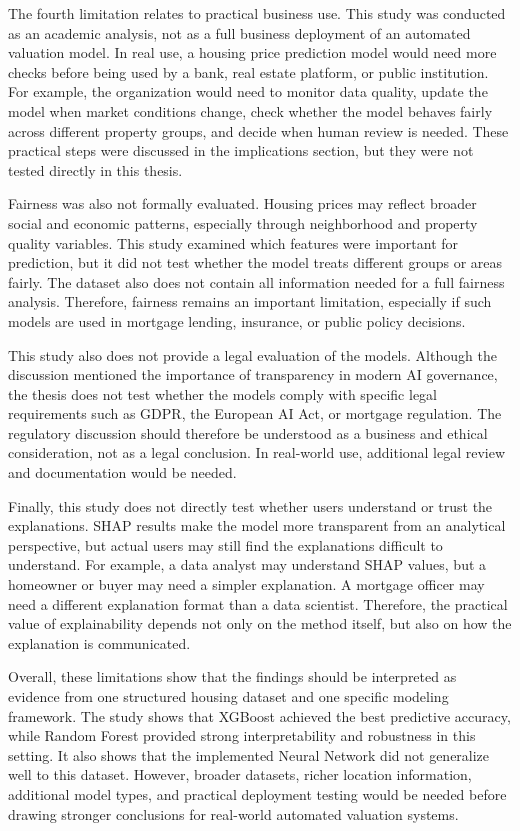 \documentclass[12pt,a4paper,oneside,openany]{book}
\begin{document}
The fourth limitation relates to practical business use. This study was conducted as an academic analysis, not as a full business deployment of an automated valuation model. In real use, a housing price prediction model would need more checks before being used by a bank, real estate platform, or public institution. For example, the organization would need to monitor data quality, update the model when market conditions change, check whether the model behaves fairly across different property groups, and decide when human review is needed. These practical steps were discussed in the implications section, but they were not tested directly in this thesis.

Fairness was also not formally evaluated. Housing prices may reflect broader social and economic patterns, especially through neighborhood and property quality variables. This study examined which features were important for prediction, but it did not test whether the model treats different groups or areas fairly. The dataset also does not contain all information needed for a full fairness analysis. Therefore, fairness remains an important limitation, especially if such models are used in mortgage lending, insurance, or public policy decisions.

This study also does not provide a legal evaluation of the models. Although the discussion mentioned the importance of transparency in modern AI governance, the thesis does not test whether the models comply with specific legal requirements such as GDPR, the European AI Act, or mortgage regulation. The regulatory discussion should therefore be understood as a business and ethical consideration, not as a legal conclusion. In real-world use, additional legal review and documentation would be needed.

Finally, this study does not directly test whether users understand or trust the explanations. SHAP results make the model more transparent from an analytical perspective, but actual users may still find the explanations difficult to understand. For example, a data analyst may understand SHAP values, but a homeowner or buyer may need a simpler explanation. A mortgage officer may need a different explanation format than a data scientist. Therefore, the practical value of explainability depends not only on the method itself, but also on how the explanation is communicated.

Overall, these limitations show that the findings should be interpreted as evidence from one structured housing dataset and one specific modeling framework. The study shows that XGBoost achieved the best predictive accuracy, while Random Forest provided strong interpretability and robustness in this setting. It also shows that the implemented Neural Network did not generalize well to this dataset. However, broader datasets, richer location information, additional model types, and practical deployment testing would be needed before drawing stronger conclusions for real-world automated valuation systems.
\end{document}
